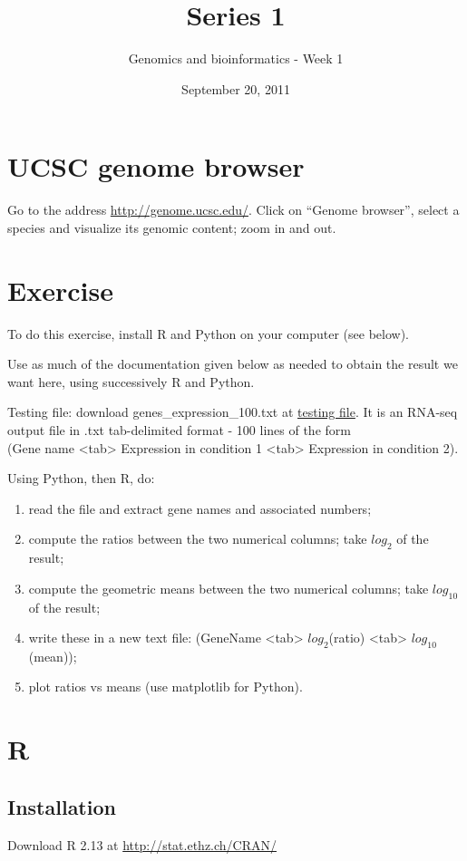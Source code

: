 \documentclass[a4paper,11pt]{article}
\title{Series 1}
\date{September 20, 2011}
\author{Genomics and bioinformatics - Week 1}
\begin{document}
\maketitle


\section{UCSC genome browser}
Go to the address \url{http://genome.ucsc.edu/}. Click on ``Genome browser'', select a species 
and visualize its genomic content; zoom in and out.

\section{Exercise}
To do this exercise, install R and Python on your computer (see below).

Use as much of the documentation given below as needed to obtain the result we want here, using successively R and Python.

Testing file: download genes\_expression\_100.txt at \url{testing file}. It is an RNA-seq output file in .txt tab-delimited format - 100 lines of the form\\
(Gene name <tab> Expression in condition 1 <tab> Expression in condition 2).

Using Python, then R, do: 
\begin{enumerate}
\item read the file and extract gene names and associated numbers;
\item compute the ratios between the two numerical columns; take $log_{2}$ of the result;
\item compute the geometric means between the two numerical columns; take $log_{10}$ of the result;
\item write these in a new text file: (GeneName <tab> $log_2$(ratio) <tab> $log_{10}$(mean));
\item plot ratios vs means (use matplotlib for Python).
\end{enumerate}

\section{R}
\subsection{Installation} 
Download R 2.13 at \url{http://stat.ethz.ch/CRAN/}
\end{document}
